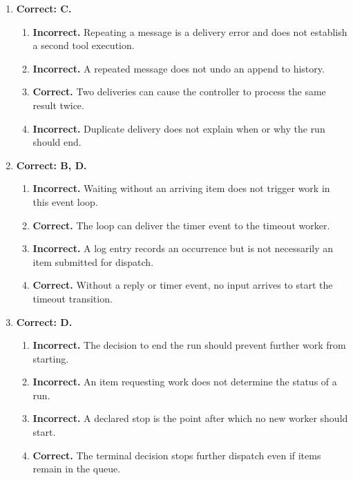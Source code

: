 \begin{enumerate}[start=41,itemsep=0.7\baselineskip]
\item[{\hyperref[exercise:46]{46.}}] \begin{minipage}[t]{\linewidth}
\textbf{Correct: C.}
\begin{enumerate}[label=\textnormal{(\Alph*)},leftmargin=*,itemsep=0pt]
\item \textbf{Incorrect.} Repeating a message is a delivery error and does not establish a second tool execution.
\item \textbf{Incorrect.} A repeated message does not undo an append to history.
\item \textbf{Correct.} Two deliveries can cause the controller to process the same result twice.
\item \textbf{Incorrect.} Duplicate delivery does not explain when or why the run should end.
\end{enumerate}
\end{minipage}

\item[{\hyperref[exercise:47]{47.}}] \begin{minipage}[t]{\linewidth}
\textbf{Correct: B, D.}
\begin{enumerate}[label=\textnormal{(\Alph*)},leftmargin=*,itemsep=0pt]
\item \textbf{Incorrect.} Waiting without an arriving item does not trigger work in this event loop.
\item \textbf{Correct.} The loop can deliver the timer event to the timeout worker.
\item \textbf{Incorrect.} A log entry records an occurrence but is not necessarily an item submitted for dispatch.
\item \textbf{Correct.} Without a reply or timer event, no input arrives to start the timeout transition.
\end{enumerate}
\end{minipage}

\item[{\hyperref[exercise:48]{48.}}] \begin{minipage}[t]{\linewidth}
\textbf{Correct: D.}
\begin{enumerate}[label=\textnormal{(\Alph*)},leftmargin=*,itemsep=0pt]
\item \textbf{Incorrect.} The decision to end the run should prevent further work from starting.
\item \textbf{Incorrect.} An item requesting work does not determine the status of a run.
\item \textbf{Incorrect.} A declared stop is the point after which no new worker should start.
\item \textbf{Correct.} The terminal decision stops further dispatch even if items remain in the queue.
\end{enumerate}
\end{minipage}


\end{enumerate}
